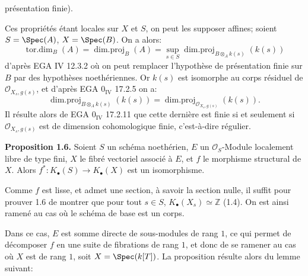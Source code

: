 présentation finie).

Ces propriétés étant locales sur $X$ et $S$, on peut les supposer affines; soient $S=\Spec(A)$, $X=\Spec(B)$. On a alors:
\[
\operatorname{tor.dim}_B(A)=\operatorname{dim.proj}_B(A)=\sup_{s\in S}\operatorname{dim.proj}_{B\otimes_A k(s)}(k(s))
\]
d'après EGA IV 12.3.2 où on peut remplacer l'hypothèse de présentation finie sur $B$ par des hypothèses noethériennes. Or $k(s)$ est isomorphe au corps résiduel de $\mathcal O_{X_s,g(s)}$, et d'après EGA $0_{\mathrm{IV}}$ 17.2.5 on a:
\[
\operatorname{dim.proj}_{B\otimes_A k(s)}(k(s))=
\operatorname{dim.proj}_{\mathcal O_{X_s,g(s)}}(k(s)).
\]
Il résulte alors de EGA $0_{\mathrm{IV}}$ 17.2.11 que cette dernière est finie si et seulement si $\mathcal O_{X_s,g(s)}$ est de dimension cohomologique finie, c'est-à-dire régulier.

\textbf{Proposition 1.6.} Soient $S$ un schéma noethérien, $E$ un $\mathcal O_S$-Module localement libre de type fini, $X$ le fibré vectoriel associé à $E$, et $f$ le morphisme structural de $X$. Alors \(f^*:K_\bullet(S)\longrightarrow K_\bullet(X)\) est un isomorphisme.

Comme $f$ est lisse, et admet une section, à savoir la section nulle, il suffit pour prouver 1.6 de montrer que pour tout $s\in S$, $K_\bullet(X_s)\simeq \mathbb Z$ (1.4). On est ainsi ramené au cas où le schéma de base est un corps.

Dans ce cas, $E$ est somme directe de sous-modules de rang $1$, ce qui permet de décomposer $f$ en une suite de fibrations de rang $1$, et donc de se ramener au cas où $X$ est de rang $1$, soit $X=\Spec(k[T])$. La proposition résulte alors du lemme suivant:

